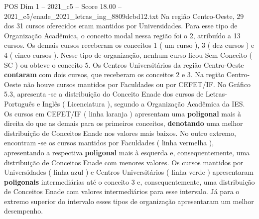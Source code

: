 \begin{textsample}{POS Dim 1 – 2021\_c5 – Score 18.00 – 2021\_c5/enade\_2021\_letras\_ing\_8809dcbd12.txt}
Na região Centro-Oeste, 29 dos 31 cursos oferecidos eram mantidos por Universidades.
Para esse tipo de Organização Acadêmica, o conceito modal nessa região foi o 2, atribuído a 13 cursos.
Os demais cursos receberam os conceitos 1 ( um curso ), 3 ( dez cursos ) e 4 ( cinco cursos ).
Nesse tipo de organização, nenhum curso ficou Sem Conceito ( SC ) ou obteve o conceito 5.
Os Centros Universitários da região Centro-Oeste \textbf{contaram} com dois cursos, que receberam os conceitos 2 e 3.
Na região Centro-Oeste não houve cursos mantidos por Faculdades ou por CEFET/IF.
No Gráfico 5.3, apresenta -se a distribuição do Conceito Enade dos cursos de Letras-Português e Inglês ( Licenciatura ), segundo a Organização Acadêmica da IES.
Os cursos em CEFET/IF ( linha laranja ) apresentam uma \textbf{poligonal} mais à direita do que as demais para os primeiros conceitos, \textbf{denotando} uma melhor distribuição de Conceitos Enade nos valores mais baixos.
No outro extremo, encontram -se os cursos mantidos por Faculdades ( linha vermelha ), apresentando a respectiva \textbf{poligonal} mais à esquerda e, consequentemente, uma distribuição de Conceitos Enade com menores valores.
Os cursos mantidos por Universidades ( linha azul ) e Centros Universitários ( linha verde ) apresentaram \textbf{poligonais} intermediárias até o conceito 3 e, consequentemente, uma distribuição de Conceitos Enade com valores intermediários para esse intervalo.
Já para o extremo superior do intervalo esses tipos de organização apresentaram um melhor desempenho.

\end{textsample}
